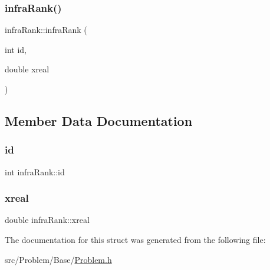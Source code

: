 \subsubsection{\texorpdfstring{infra\+Rank()}{infraRank()}}
{\footnotesize\ttfamily infra\+Rank\+::infra\+Rank (\begin{DoxyParamCaption}\item[{int}]{id,  }\item[{double}]{xreal }\end{DoxyParamCaption})\hspace{0.3cm}{\ttfamily [inline]}}



\subsection{Member Data Documentation}
\mbox{\label{structinfraRank_ace3640f7fdc691b68111cf07e0eabaae}} 
\subsubsection{\texorpdfstring{id}{id}}
{\footnotesize\ttfamily int infra\+Rank\+::id}

\mbox{\label{structinfraRank_a1bb966369809456d65bd4e2d4e19d775}} 
\subsubsection{\texorpdfstring{xreal}{xreal}}
{\footnotesize\ttfamily double infra\+Rank\+::xreal}



The documentation for this struct was generated from the following file\+:\begin{DoxyCompactItemize}
\item 
src/\+Problem/\+Base/\mbox{\hyperlink{Problem_8h}{Problem.\+h}}\end{DoxyCompactItemize}
